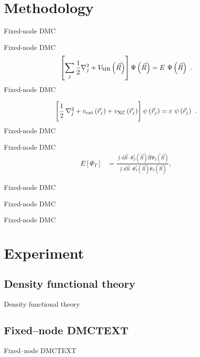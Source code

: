 \documentclass[aps,prb,groupedaddress,twocolumn,showpacs,dvipdfmx, superscriptaddress,pdftex]{revtex4-2}
\newcommand{\ghost}[1]{}
\begin{document}
\section{Methodology}
\label{sec.method}
Fixed-node DMC

\vspace{2mm}
Fixed-node DMC
\begin{equation}
\left[\sum_j\frac{1}{2}\nabla^2_j
+ V_{\rm MB}\left(\vec R\right)
\right]\Psi\left(\vec R\right)
= E~\Psi\left(\vec R\right) \ .
\end{equation}
Fixed-node DMC

\begin{equation}
\left[\cfrac{1}{2}~\nabla^2_j
+ v_{\rm ext}\left(\vec r_j\right)
+ v_{\rm XC}\left(\vec r_j\right)
\right]\psi\left(\vec r_j\right)
= \varepsilon~\psi\left(\vec r_j\right) \ .
\end{equation}
Fixed-node DMC

\vspace{2mm}
Fixed-node DMC
\begin{align}
  E\left[\Psi_T\right]
  &=\frac{\int d\vec{R}\cdot \Psi_T^*\left(\vec{R}\right)
  \hat{H}\Psi_T\left(\vec{R}\right)}{\int d\vec{R}\cdot \Psi_T^*\left(\vec{R}\right)\Psi_T\left(\vec{R}\right)} ,
  \label{eq.varfunc}
\end{align}
\ghost{eq.varfunc}
Fixed-node DMC

\vspace{2mm}
Fixed-node DMC

\vspace{2mm}
Fixed-node DMC

\section{Experiment}
\label{sec.experiment}
\subsection{Density functional theory}
Density functional theory

\subsection{Fixed--node DMCTEXT}
Fixed--node DMCTEXT
\end{document}
